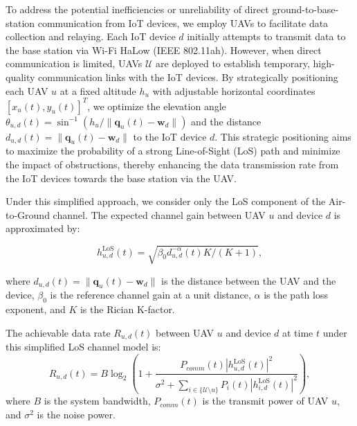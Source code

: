 \documentclass[10pt,conference,letterpaper]{IEEEtran}
\begin{document}
To address the potential inefficiencies or unreliability of direct ground-to-base-station communication from IoT devices, we employ UAVs to facilitate data collection and relaying. Each IoT device $d$ initially attempts to transmit data to the base station via Wi-Fi HaLow (IEEE 802.11ah). However, when direct communication is limited, UAVs $\mathcal{U}$ are deployed to establish temporary, high-quality communication links with the IoT devices. By strategically positioning each UAV $u$ at a fixed altitude $h_u$ with adjustable horizontal coordinates $[x_u(t), y_u(t)]^T$, we optimize the elevation angle $\theta_{u,d}(t) = \sin^{-1}(h_u/\|\mathbf{q}_u(t) - \mathbf{w}_d\|)$ and the distance $d_{u,d}(t) = \|\mathbf{q}_u(t) - \mathbf{w}_d\|$ to the IoT device $d$. This strategic positioning aims to maximize the probability of a strong Line-of-Sight (LoS) path and minimize the impact of obstructions, thereby enhancing the data transmission rate from the IoT devices towards the base station via the UAV.







Under this simplified approach, we consider only the LoS component of the Air-to-Ground channel. The expected channel gain between UAV $u$ and device $d$ is approximated by:

\begin{equation}
h_{u,d}^{\text{LoS}}(t) = \sqrt{\beta_0 d_{u,d}^{-\alpha}(t)K/(K+1)},
\end{equation}

where $d_{u,d}(t) = \|\mathbf{q}_u(t) - \mathbf{w}_d\|$ is the distance between the UAV and the device, $\beta_0$ is the reference channel gain at a unit distance, $\alpha$ is the path loss exponent, and $K$ is the Rician K-factor. %

The achievable data rate $R_{u,d}(t)$ between UAV $u$ and device $d$ at time $t$ under this simplified LoS channel model is:
\begin{equation}
R_{u,d}(t) = B\log_2\left(1 + \frac{P_{comm}(t) |h_{u,d}^{\text{LoS}}(t)|^2}{\sigma^2 + \sum_{i\in\{\mathcal{U}\setminus u\}} P_i(t) |h_{i,d}^{\text{LoS}}(t)|^2}\right),
\end{equation}
where $B$ is the system bandwidth, $P_{comm}(t)$ is the transmit power of UAV $u$, and $\sigma^2$ is the noise power. 
\end{document}
